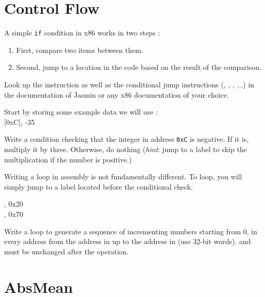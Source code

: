 \documentclass{../../tp}
\begin{document}
\section{Control Flow}

A simple \texttt{if} condition in x86 works in two steps : 
\begin{enumerate}
	\item First, compare two items between them.
	\item Second, jump to a location in the code based on the result of the comparison.
\end{enumerate}

Look up the  instruction as well as the conditional jump instructions (, , , ...) in the documentation of \textsf{Jasmin} or any x86 documentation of your choice.

\begin{instruction}
	
	Start by storing some example data we will use :\\
	
	{\ttfamily {} [0xC], -35 \\}
	
	Write a condition checking that the integer in address \texttt{0xC} is negative. If it is, multiply it by three. Otherwise, do nothing (\emph{hint}: jump to a label to skip the multiplication if the number is positive.)

\end{instruction}


Writing a loop in assembly is not fundamentally different. To loop, you will simply jump to a label located before the conditional check.

\begin{instruction}
	
	{\ttfamily {} , 0x20 \\
		 , 0x70 \\}	
	
Write a loop to generate a sequence of incrementing numbers 
starting from 0, in every address from the address in  
up to the address in  (use 32-bit words).
 and  must be unchanged after the operation.
\end{instruction}


\section{AbsMean}
\end{document}
